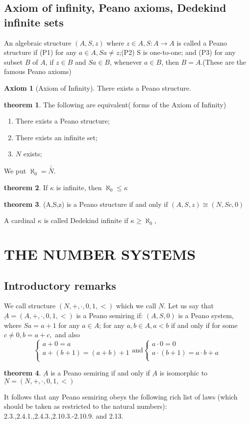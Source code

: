 \documentclass[a4paper,11pt]{article}%
\theoremstyle{remark}
\theoremstyle{definition}
\newtheorem{theorem}{theorem}[section]
\theoremstyle{definition}
\theoremstyle{plain}
\theoremstyle{definition}
\newtheorem{axiom}{Axiom}
\begin{document}
\subsection{Axiom of infinity, Peano axioms, Dedekind infinite sets}
An algebraic structure $(A,S,z)$ where $z\in A,S:A\rightarrow A$ is called a
Peano structure if (P1) for any $a\in A, Sa\neq z$;(P2) S is one-to-one; and (P3) for any subset 
$B$ of $A$, if $z\in B$ and $Sa\in B$, whenever $a\in B$, then $B=A$.(These are the famous Peano axioms)
\begin{axiom}[Axiom of Infinity]
    There exists a Peano structure.
\end{axiom}
\begin{theorem}
    The following are equivalent( forms of the Axiom of Infinity)
    \begin{enumerate}
        \item There exists a Peano structure;
        \item There exists an infinite set;
        \item $N$ exists;
    \end{enumerate}
\end{theorem}
We put $\aleph_0=\bar{\bar{N}}$.

\begin{theorem}
    If $\kappa$ is infinite, then $\aleph_0\leq\kappa$
\end{theorem}
\begin{theorem}
    (A,S,z) is a Peano structure if and only if $(A,S,z)\cong(N,Sc,0)$
\end{theorem}
A cardinal $\kappa$ is called Dedekind infinite if $\kappa\geq\aleph_0,$
\section{THE NUMBER SYSTEMS}
\subsection{Introductory remarks}
We call structure $(N,+,\cdot,0,1,<)$ which we call $\underbar{N}$. Let us 
say that $\underbar{A}=(A,+,\cdot,0,1,<)$ is a Peano semiring if: $(A,S,0)$ is
a Peano system, where $Sa=a+1$ for any $a\in A$; for any $a,b\in A, a<b$ if and only 
if for some $c\neq 0, b=a+c,$ and also 
\[\begin{cases}
    a+0=a\\
    a+(b+1)=(a+b)+1\\
\end{cases} \text{and}\begin{cases}
    a\cdot 0=0\\
    a\cdot(b+1)=a\cdot b+a\\
\end{cases}\]
\begin{theorem}
    $\underbar{A}$ is a Peano semiring if and only if $\underbar{A}$ is 
    isomorphic to $\underbar{N}=(N,+,\cdot,0,1,<)$
\end{theorem}
It follows that any Peano semiring obeys the following rich list of laws (which 
should be taken as restricted to the natural numbers): 2.3.,2.4.1.,2.4.3.,2.10.3.-2.10.9. and
2.13.
\end{document}
